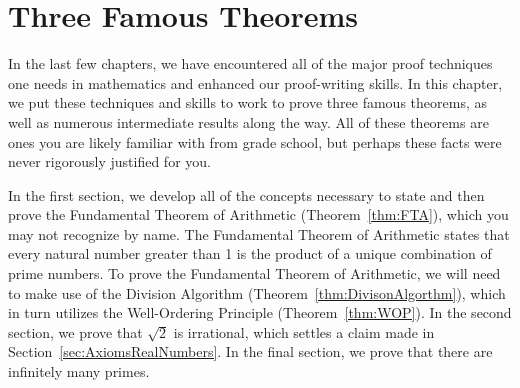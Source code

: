 \chapter{Three Famous Theorems}\label{chap:three famous theorems}


In the last few chapters, we have encountered all of the major proof techniques one needs in mathematics and enhanced our proof-writing skills.  In this chapter, we put these techniques and skills to work to prove three famous theorems, as well as numerous intermediate results along the way.  All of these theorems are ones you are likely familiar with from grade school, but perhaps these facts were never rigorously justified for you. 

In the first section, we develop all of the concepts necessary to state and then prove the Fundamental Theorem of Arithmetic (Theorem~\ref{thm:FTA}), which you may not recognize by name. The Fundamental Theorem of Arithmetic states that every natural number greater than 1 is the product of a unique combination of prime numbers. To prove the Fundamental Theorem of Arithmetic, we will need to make use of the Division Algorithm (Theorem~\ref{thm:DivisonAlgorthm}), which in turn utilizes the Well-Ordering Principle (Theorem~\ref{thm:WOP}). In the second section, we prove that $\sqrt{2}$ is irrational, which settles a claim made in Section~\ref{sec:AxiomsRealNumbers}. In the final section, we prove that there are infinitely many primes.